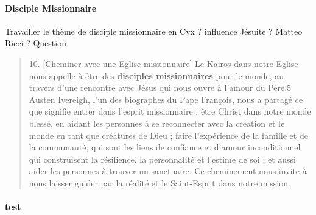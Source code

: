 \paragraph{Disciple Missionnaire} Travailler le thème de disciple
missionnaire en Cvx ? influence
Jésuite ? Matteo Ricci ? Question

\begin{quote}
    10. [Cheminer avec une Eglise missionnaire] Le Kairos dans notre Eglise nous appelle à être des \textbf{disciples missionnaires} pour le monde, au travers d’une rencontre avec Jésus qui nous ouvre à l’amour du Père.5 Austen Ivereigh, l’un des biographes du Pape François, nous a partagé ce que signifie entrer dans l’esprit missionnaire : être Christ dans notre monde blessé, en aidant les personnes à se reconnecter avec la création et le monde en tant que créatures de Dieu ; faire l’expérience de la famille et de la communauté, qui sont les liens de confiance et d’amour inconditionnel qui construisent la résilience, la personnalité et l’estime de soi ; et aussi aider les personnes à trouver un sanctuaire. Ce cheminement nous invite à nous laisser guider par la réalité et le Saint-Esprit dans notre mission. 
\end{quote}


\paragraph{test} \cite{Gardet:IntroductionTheoMusulmane}